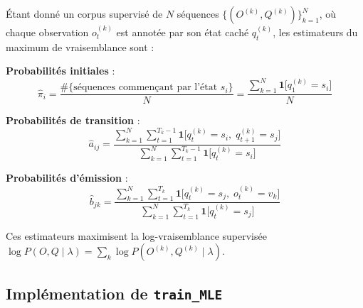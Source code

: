 \documentclass[12pt,a4paper]{article}
\begin{document}
Étant donné un corpus supervisé de $N$ séquences $\{(O^{(k)}, Q^{(k)})\}_{k=1}^{N}$,
où chaque observation $o_t^{(k)}$ est annotée par son état caché $q_t^{(k)}$, les
estimateurs du maximum de vraisemblance sont :

\begin{formulebox}
\textbf{Probabilités initiales} :
\[
  \hat{\pi}_i = \frac{\#\{\text{séquences commençant par l'état } s_i\}}{N}
             = \frac{\displaystyle\sum_{k=1}^{N} \mathbf{1}\bigl[q_1^{(k)} = s_i\bigr]}{N}
\]

\textbf{Probabilités de transition} :
\[
  \hat{a}_{ij} =
  \frac{\displaystyle\sum_{k=1}^{N}\sum_{t=1}^{T_k - 1}
        \mathbf{1}\bigl[q_t^{(k)}=s_i,\; q_{t+1}^{(k)}=s_j\bigr]}
       {\displaystyle\sum_{k=1}^{N}\sum_{t=1}^{T_k - 1}
        \mathbf{1}\bigl[q_t^{(k)}=s_i\bigr]}
\]

\textbf{Probabilités d'émission} :
\[
  \hat{b}_{jk} =
  \frac{\displaystyle\sum_{k=1}^{N}\sum_{t=1}^{T_k}
        \mathbf{1}\bigl[q_t^{(k)}=s_j,\; o_t^{(k)}=v_k\bigr]}
       {\displaystyle\sum_{k=1}^{N}\sum_{t=1}^{T_k}
        \mathbf{1}\bigl[q_t^{(k)}=s_j\bigr]}
\]
\end{formulebox}

Ces estimateurs maximisent la log-vraisemblance supervisée
$\log P(O, Q \mid \lambda) = \sum_k \log P(O^{(k)}, Q^{(k)} \mid \lambda)$.

\subsection{Implémentation de \texttt{train\_MLE}}
\end{document}
